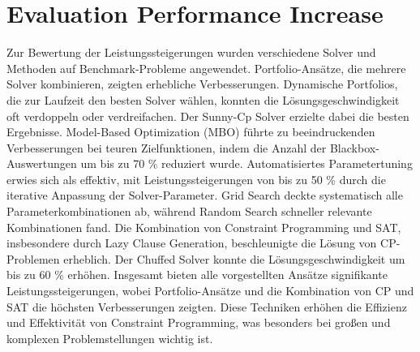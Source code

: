 \section{Evaluation Performance Increase}
\label{sec:Evaluation Performance Increase}
Zur Bewertung der Leistungssteigerungen wurden verschiedene Solver und Methoden
auf Benchmark-Probleme angewendet. 
Portfolio-Ansätze, die mehrere Solver kombinieren, zeigten erhebliche
Verbesserungen. Dynamische Portfolios, die zur Laufzeit den besten Solver
wählen, konnten die Lösungsgeschwindigkeit oft verdoppeln oder verdreifachen.
Der Sunny-Cp Solver erzielte dabei die besten Ergebnisse.
Model-Based Optimization (MBO) führte zu beeindruckenden Verbesserungen bei
teuren Zielfunktionen, indem die Anzahl der Blackbox-Auswertungen um bis zu 70 \%
reduziert wurde.
Automatisiertes Parametertuning erwies sich als effektiv, mit
Leistungssteigerungen von bis zu 50 \% durch die iterative Anpassung der
Solver-Parameter. Grid Search deckte systematisch alle Parameterkombinationen
ab, während Random Search schneller relevante Kombinationen fand.
Die Kombination von Constraint Programming und SAT, insbesondere durch Lazy
Clause Generation, beschleunigte die Lösung von CP-Problemen erheblich. Der
Chuffed Solver konnte die Lösungsgeschwindigkeit um bis zu 60 \% erhöhen.
Insgesamt bieten alle vorgestellten Ansätze signifikante Leistungssteigerungen,
wobei Portfolio-Ansätze und die Kombination von CP und SAT die höchsten
Verbesserungen zeigten. Diese Techniken erhöhen die Effizienz und Effektivität
von Constraint Programming, was besonders bei großen und komplexen
Problemstellungen wichtig ist. 


\printbibliography[heading=bibintoc]





